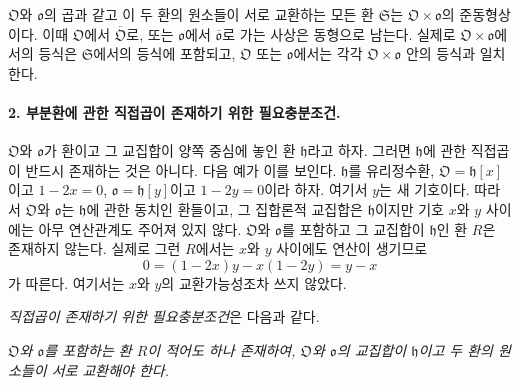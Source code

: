 \(\mathfrak O\)와 \(\mathfrak o\)의 곱과 같고 이 두 환의 원소들이 서로 교환하는 모든 환 \(\mathfrak S\)는 \(\mathfrak O\times\mathfrak o\)의 준동형상이다. 이때 \(\mathfrak O\)에서 \(\overline{\mathfrak O}\)로, 또는 \(\mathfrak o\)에서 \(\overline{\mathfrak o}\)로 가는 사상은 동형으로 남는다. 실제로 \(\mathfrak O\times\mathfrak o\)에서의 등식은 \(\mathfrak S\)에서의 등식에 포함되고, \(\mathfrak O\) 또는 \(\mathfrak o\)에서는 각각 \(\mathfrak O\times\mathfrak o\) 안의 등식과 일치한다.

\paragraph{2. 부분환에 관한 직접곱이 존재하기 위한 필요충분조건.}
\(\mathfrak O\)와 \(\mathfrak o\)가 환이고 그 교집합이 양쪽 중심에 놓인 환 \(\mathfrak h\)라고 하자. 그러면 \(\mathfrak h\)에 관한 직접곱이 반드시 존재하는 것은 아니다. 다음 예가 이를 보인다. \(\mathfrak h\)를 유리정수환, \(\mathfrak O=\mathfrak h[x]\)이고 \(1-2x=0\), \(\mathfrak o=\mathfrak h[y]\)이고 \(1-2y=0\)이라 하자. 여기서 \(y\)는 새 기호이다. 따라서 \(\mathfrak O\)와 \(\mathfrak o\)는 \(\mathfrak h\)에 관한 동치인 환들이고, 그 집합론적 교집합은 \(\mathfrak h\)이지만 기호 \(x\)와 \(y\) 사이에는 아무 연산관계도 주어져 있지 않다. \(\mathfrak O\)와 \(\mathfrak o\)를 포함하고 그 교집합이 \(\mathfrak h\)인 환 \(R\)은 존재하지 않는다. 실제로 그런 \(R\)에서는 \(x\)와 \(y\) 사이에도 연산이 생기므로
\[
0=(1-2x)y-x(1-2y)=y-x
\]
가 따른다. 여기서는 \(x\)와 \(y\)의 교환가능성조차 쓰지 않았다.

\emph{직접곱이 존재하기 위한 필요충분조건}은 다음과 같다.

\emph{\(\mathfrak O\)와 \(\mathfrak o\)를 포함하는 환 \(R\)이 적어도 하나 존재하여, \(\mathfrak O\)와 \(\mathfrak o\)의 교집합이 \(\mathfrak h\)이고 두 환의 원소들이 서로 교환해야 한다.}

